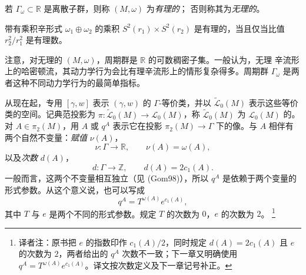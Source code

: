 \begin{definition}
\label{def:18-rational-symplectic-manifold}
若 $\Gamma_\omega\subset\mathbb R$ 是离散子群，则称 $(M,\omega)$ 为\emph{有理的}；
否则称其为\emph{无理的}。
\end{definition}

\begin{example}
\label{ex:18-product-spheres-rationality}
带有乘积辛形式 $\omega_1\oplus\omega_2$ 的乘积
$S^2(r_1)\times S^2(r_2)$ 是有理的，当且仅当比值 $r_2^2/r_1^2$ 是有理数。
\end{example}

\begin{remark}
\label{rem:18-irrational-period-group}
注意，对无理的 $(M,\omega)$，周期群是 $\mathbb R$ 的可数稠密子集。一般认为，无理
辛流形上的哈密顿流，其动力学行为会比有理辛流形上的情形复杂得多。周期群
$\Gamma_\omega$ 是两者这种不同动力学行为的最简单指标。
\end{remark}

从现在起，专用 $[\gamma,w]$ 表示 $(\gamma,w)$ 的 $\Gamma$-等价类，并以
$\widetilde{\mathcal L}_0(M)$ 表示这些等价类的空间。记典范投影为
$\pi:\widetilde{\mathcal L}_0(M)\to\mathcal L_0(M)$，称
$\widetilde{\mathcal L}_0(M)$ 为 $\mathcal L_0(M)$ 的\termGammaCoveringSpace{}。
对 $A\in\pi_2(M)$，用 $A$ 或 $q^A$ 表示它在投影
$\pi_2(M)\to\Gamma$ 下的像。与 $A$ 相伴有两个自然不变量：\emph{赋值} $\nu(A)$，
\begin{equation}
 \nu:\Gamma\longrightarrow\mathbb R,\qquad \nu(A)=\omega(A),
 \label{eq:18-gamma-valuation}
\end{equation}
以及\emph{次数} $d(A)$，
\begin{equation}
 d:\Gamma\longrightarrow\mathbb Z,\qquad d(A)=2c_1(A).
 \label{eq:18-gamma-degree}
\end{equation}
一般而言，这两个不变量相互独立（见 (Gom98)），所以 $q^A$ 是依赖于两个变量的
形式参数。从这个意义说，也可以写成
\[
 q^A=T^{\omega(A)}e^{c_1(A)},
\]
其中 $T$ 与 $e$ 是两个不同的形式参数。规定 $T$ 的次数为 $0$，$e$ 的次数为 $2$。
\footnote{译者注：原书把 $e$ 的指数印作 $c_1(A)/2$，同时规定
$d(A)=2c_1(A)$ 且 $e$ 的次数为 $2$，两者给出的 $q^A$ 次数不一致；下一章又明确使用
$q^A=T^{\omega(A)}e^{c_1(A)}$。译文按次数定义及下一章记号补正。}

